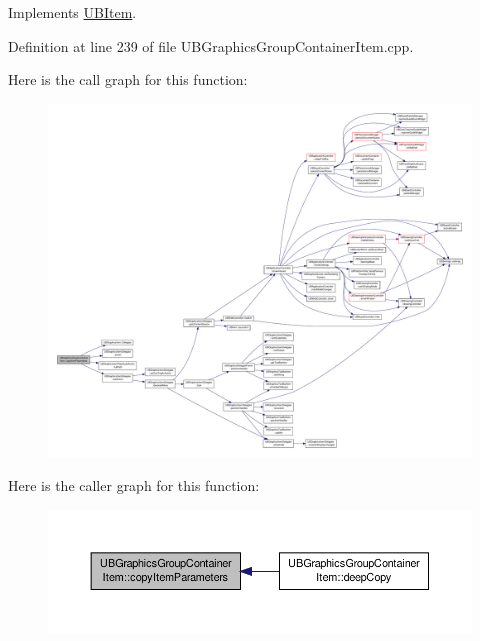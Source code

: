 Implements \hyperlink{class_u_b_item_a21483eccaad22369e9fe6bca838af029}{U\-B\-Item}.



Definition at line 239 of file U\-B\-Graphics\-Group\-Container\-Item.\-cpp.



Here is the call graph for this function\-:
\nopagebreak
\begin{figure}[H]
\begin{center}
\leavevmode
\includegraphics[width=350pt]{de/d93/class_u_b_graphics_group_container_item_a70f918cf5ac238dc33232946fa893f9a_cgraph}
\end{center}
\end{figure}




Here is the caller graph for this function\-:
\nopagebreak
\begin{figure}[H]
\begin{center}
\leavevmode
\includegraphics[width=350pt]{de/d93/class_u_b_graphics_group_container_item_a70f918cf5ac238dc33232946fa893f9a_icgraph}
\end{center}
\end{figure}


